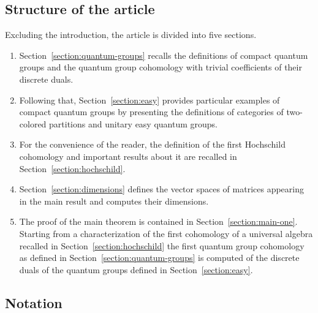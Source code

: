 \documentclass[10pt,a4paper]{amsart}
\numberwithin{equation}{section}
\begin{document}
\subsection{Structure of the article}
\label{section:introduction-structure-of-the-article}
Excluding the introduction, the article is divided into five sections.
\begin{enumerate}[label=$\square$]\itemsep=0pt
\item Section~\ref{section:quantum-groups} recalls the definitions of compact quantum groups and the quantum group cohomology with trivial coefficients of their discrete duals.
\item
Following that, Section~\ref{section:easy} provides particular examples of compact quantum groups by presenting the definitions of categories of two-co\-lo\-red partitions and unitary easy quantum groups.
\item
For the convenience of the reader, the definition of the first Hochschild cohomology and important results about it are recalled in Section~\ref{section:hochschild}.
\item
Section~\ref{section:dimensions} defines the vector spaces of matrices appearing in the main result and computes their dimensions.
\item
The proof of the main theorem is contained in Section~\ref{section:main-one}. Starting from a characterization of the first cohomology of a universal algebra recalled in Section~\ref{section:hochschild}  the first quantum group cohomology as defined in Section~\ref{section:quantum-groups} is computed of the discrete duals of the quantum groups defined in Section~\ref{section:easy}.
\end{enumerate}

\subsection{Notation}
\label{section:introduction-notation}

\makeatletter
\providecommand*{\cupdot}{%
  \mathbin{%
    \mathpalette\@cupdot{}%
  }%
}
\newcommand*{\@cupdot}[2]{%
  \ooalign{%
    $\m@th#1\cup$\cr
    \hidewidth$\m@th#1\cdot$\hidewidth
  }%
}
\makeatother

\makeatletter
\providecommand*{\bigcupdot}{%
  \mathbin{%
    \mathpalette\@bigcupdot{}%
  }%
}
\newcommand*{\@bigcupdot}[2]{%
  \ooalign{%
    $\m@th#1\bigcup$\cr
    \hidewidth$\m@th#1\cdot$\hidewidth
  }%
}
\makeatother
\end{document}
